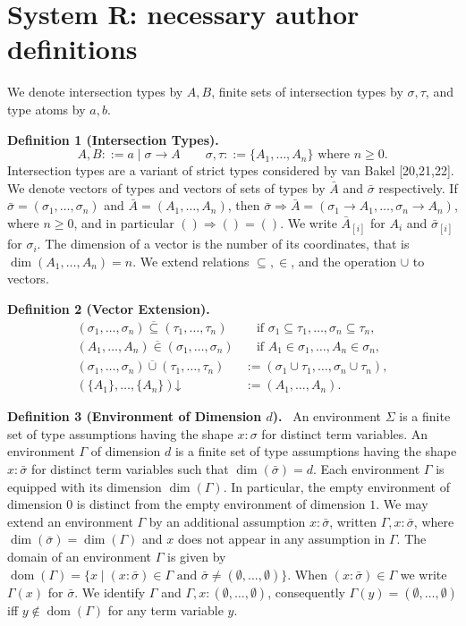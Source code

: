 \documentclass[10pt,a4paper]{article}
\newcommand{\Av}{\bar A}\newcommand{\Bv}{\bar B}\newcommand{\Cv}{\bar C}
\newcommand{\sv}{\bar\sigma}\newcommand{\tv}{\bar\tau}
\newcommand{\vsub}{\mathrel{\overline{\subseteq}}}
\newcommand{\vin}{\mathrel{\overline{\in}}}
\newcommand{\vcup}{\mathbin{\overline{\cup}}}
\newcommand{\dimn}{\operatorname{dim}}
\newcommand{\dom}{\operatorname{dom}}
\newcommand{\orig}[2]{\par\medskip\noindent\textbf{#1 #2.}\ }
\begin{document}
\section*{System R: necessary author definitions}
We denote intersection types by $A,B$, finite sets of intersection types by $\sigma,\tau$, and type atoms by $a,b$.
\orig{Definition}{1 (Intersection Types)}
\[A,B ::= a\mid\sigma\to A\qquad\sigma,\tau::=\{A_1,\ldots,A_n\}\text{ where }n\geq0.\]
Intersection types are a variant of strict types considered by van Bakel [20,21,22].
We denote vectors of types and vectors of sets of types by $\Av$ and $\sv$ respectively. If $\sv=(\sigma_1,\ldots,\sigma_n)$ and $\Av=(A_1,\ldots,A_n)$, then $\sv\Rightarrow\Av=(\sigma_1\to A_1,\ldots,\sigma_n\to A_n)$, where $n\geq0$, and in particular $()\Rightarrow()=()$. We write $\Av_{[i]}$ for $A_i$ and $\sv_{[i]}$ for $\sigma_i$. The dimension of a vector is the number of its coordinates, that is $\dimn(A_1,\ldots,A_n)=n$. We extend relations $\subseteq,\in$, and the operation $\cup$ to vectors.
\orig{Definition}{2 (Vector Extension)}
\begin{align*}
(\sigma_1,\ldots,\sigma_n)\vsub(\tau_1,\ldots,\tau_n)&\quad\text{if }\sigma_1\subseteq\tau_1,\ldots,\sigma_n\subseteq\tau_n,\\
(A_1,\ldots,A_n)\vin(\sigma_1,\ldots,\sigma_n)&\quad\text{if }A_1\in\sigma_1,\ldots,A_n\in\sigma_n,\\
(\sigma_1,\ldots,\sigma_n)\vcup(\tau_1,\ldots,\tau_n)&:=(\sigma_1\cup\tau_1,\ldots,\sigma_n\cup\tau_n),\\
(\{A_1\},\ldots,\{A_n\})\mathord\downarrow&:=(A_1,\ldots,A_n).
\end{align*}
\orig{Definition}{3 (Environment of Dimension $d$)}
An environment $\Sigma$ is a finite set of type assumptions having the shape $x:\sigma$ for distinct term variables. An environment $\Gamma$ of dimension $d$ is a finite set of type assumptions having the shape $x:\sv$ for distinct term variables such that $\dimn(\sv)=d$.
Each environment $\Gamma$ is equipped with its dimension $\dimn(\Gamma)$. In particular, the empty environment of dimension $0$ is distinct from the empty environment of dimension $1$.
We may extend an environment $\Gamma$ by an additional assumption $x:\sv$, written $\Gamma,x:\sv$, where $\dimn(\sv)=\dimn(\Gamma)$ and $x$ does not appear in any assumption in $\Gamma$. The domain of an environment $\Gamma$ is given by $\dom(\Gamma)=\{x\mid(x:\sv)\in\Gamma\text{ and }\sv\neq(\emptyset,\ldots,\emptyset)\}$. When $(x:\sv)\in\Gamma$ we write $\Gamma(x)$ for $\sv$. We identify $\Gamma$ and $\Gamma,x:(\emptyset,\ldots,\emptyset)$, consequently $\Gamma(y)=(\emptyset,\ldots,\emptyset)$ iff $y\notin\dom(\Gamma)$ for any term variable $y$.
\end{document}

